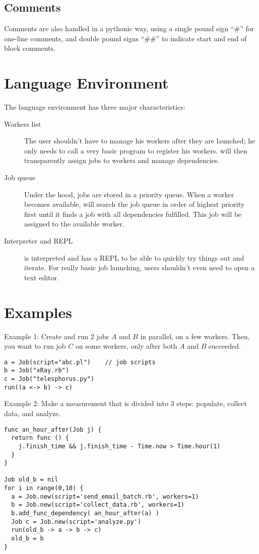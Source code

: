 \subsection*{Comments}
Comments are also handled in a pythonic way, using a single pound sign ``\#'' for
one-line comments, and double pound signs ``\#\#'' to indicate start and end of block comments.

%

\section{Language Environment}
\label{sect:tech}
The language environment has three major characteristics:
\begin{description}
\item[Workers list] The user shouldn't have to manage his workers after
they are launched; he only needs to call a very basic program
to register his workers. \lang{} will then transparently assign jobs to workers
and manage dependencies.
\item[Job queue] Under the hood, jobs are stored in a priority queue. When a
worker becomes available, \lang{} will search the job queue in order of highest
priority first until it finds a job with all dependencies fulfilled. This job
will be assigned to the available worker.
\item[Interpreter and REPL] \lang{} is interpreted and has a REPL to be able to
quickly try things out and iterate. For really basic job launching, users shouldn't
even need to open a text editor.
\end{description}

\section{Examples}
\label{sect:ex}
Example 1: Create and run 2 jobs $A$ and $B$ in parallel, on a few
workers. Then, you want to run job $C$ on some workers, only after both $A$
and $B$ succeeded.
\begin{lstlisting}
a = Job(script="abc.pl")    // job scripts
b = Job("xRay.rb")
c = Job("telesphorus.py")
run((a <-> b) -> c)
\end{lstlisting}
Example 2: Make a measurement that is divided into 3 steps: populate, collect
data, and analyze.
\begin{lstlisting}
func an_hour_after(Job j) {
  return func () {
    j.finish_time && j.finish_time - Time.now > Time.hour(1)
  }
}

Job old_b = nil
for i in range(0,10) {
  a = Job.new(script='send_email_batch.rb', workers=1)
  b = Job.new(script='collect_data.rb', workers=1)
  b.add_func_dependency( an_hour_after(a) )
  Job c = Job.new(script='analyze.py')
  run(old_b -> a -> b -> c)
  old_b = b
}
\end{lstlisting}

